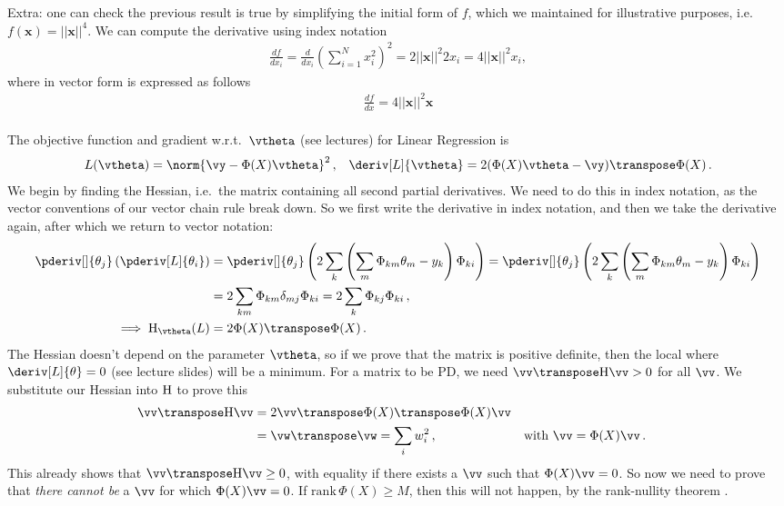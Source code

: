 \begin{enumerate}[label=\alph*.]
Extra: one can check the previous result is true by simplifying the initial form of $f$, which we maintained for illustrative purposes, i.e. $f(\textbf{x}) = ||\textbf{x}||^4$. We can compute the derivative using index notation
\begin{align*}
\frac{df}{d x_i} = \frac{d}{d x_i}\left(\sum_{i=1}^N x_i^2 \right)^2 = 2||\textbf{x}||^2 2x_i = 4||\textbf{x}||^2 x_i,
\end{align*}
where in vector form is expressed as follows
\begin{align*}
\frac{df}{d x} = 4||\textbf{x}||^2 \textbf{x}
\end{align*}

\end{enumerate}






\paragraph{}
The objective function and gradient w.r.t.~$\vtheta$ (see lectures) for Linear Regression is
\begin{align}
L(\vtheta) = \norm{\vy - \Phi(X)\vtheta}^2 \,, &&
\deriv[L]{\vtheta} = 2(\Phi(X)\vtheta - \vy)\transpose\Phi(X) \,.
\end{align}
We begin by finding the Hessian, i.e.~the matrix containing all second partial derivatives. We need to do this in index notation, as the vector conventions of our vector chain rule break down. So we first write the derivative in index notation, and then we take the derivative again, after which we return to vector notation:
\begin{align}
\pderiv[]{\theta_j} \left(\pderiv[L]{\theta_i}\right) &=
\pderiv[]{\theta_j} \left(2\sum_k\left(\sum_m\Phi_{km}\theta_m - y_k\right)\Phi_{ki}\right) =
\pderiv[]{\theta_j} \left(2\sum_k\left(\sum_m\Phi_{km}\theta_m - y_k\right)\Phi_{ki}\right) \\
&= 2\sum_{km}\Phi_{km}\delta_{mj}\Phi_{ki} = 2\sum_{k}\Phi_{kj}\Phi_{ki} \,, \\
\implies \mat H_{\vtheta}(L) &= 2 \Phi(X)\transpose\Phi(X) \,.
\end{align}
The Hessian doesn't depend on the parameter $\vtheta$, so if we prove that the matrix is positive definite, then the local where $\deriv[L]{\theta} = 0$ (see lecture slides) will be a minimum. For a matrix to be PD, we need $\vv\transpose\mat H\vv > 0$ for all $\vv$. We substitute our Hessian into ${\mathrm{{H}}}$ to prove this
\begin{align}
\vv\transpose \mat H \vv &= 2\vv\transpose \Phi(X)\transpose\Phi(X) \vv \\
&= \vw\transpose\vw = \sum_i w_i^2\,, && \text{with } \vv = \Phi(X)\vv\,.
\end{align}
This already shows that $\vv\transpose \mat H \vv \geq 0$, with equality if there exists a $\vv$ such that $\Phi(X)\vv = 0$. So now we need to prove that \emph{there cannot be} a $\vv$ for which $\Phi(X)\vv = 0$. If $\mathrm{rank}\,\Phi(X) \geq M$, then this will not happen, by the rank-nullity theorem \citep[\S 2.7.3]{mml}.


